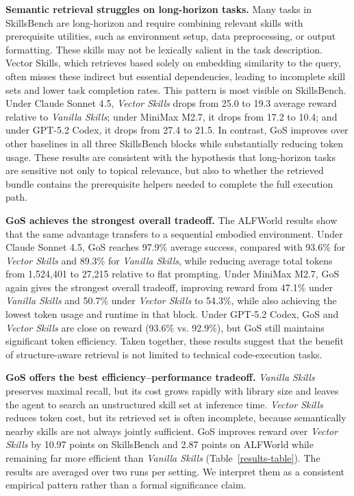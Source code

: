 \noindent\textbf{Semantic retrieval struggles on long-horizon tasks.}
% 
Many tasks in SkillsBench are long-horizon and require combining relevant skills with prerequisite utilities, such as environment setup, data preprocessing, or output formatting. These skills may not be lexically salient in the task description.
%
Vector Skills, which retrieves based solely on embedding similarity to the query, often misses these indirect but essential dependencies, leading to incomplete skill sets and lower task completion rates.
%
This pattern is most visible on SkillsBench. Under Claude Sonnet 4.5, \textit{Vector Skills} drops from 25.0 to 19.3 average reward relative to \textit{Vanilla Skills}; under MiniMax M2.7, it drops from 17.2 to 10.4; and under GPT-5.2 Codex, it drops from 27.4 to 21.5. In contrast, GoS improves over other baselines in all three SkillsBench blocks while substantially reducing token usage.
%
These results are consistent with the hypothesis that long-horizon tasks are sensitive not only to topical relevance, but also to whether the retrieved bundle contains the prerequisite helpers needed to complete the full execution path.


\noindent\textbf{GoS achieves the strongest overall tradeoff.}
%
The ALFWorld results show that the same advantage transfers to a sequential embodied environment. Under Claude Sonnet 4.5, GoS reaches 97.9\% average success, compared with 93.6\% for \textit{Vector Skills} and 89.3\% for \textit{Vanilla Skills}, while reducing average total tokens from 1,524,401 to 27,215 relative to flat prompting. Under MiniMax M2.7, GoS again gives the strongest overall tradeoff, improving reward from 47.1\% under \textit{Vanilla Skills} and 50.7\% under \textit{Vector Skills} to 54.3\%, while also achieving the lowest token usage and runtime in that block. Under GPT-5.2 Codex, GoS and \textit{Vector Skills} are close on reward (93.6\% vs. 92.9\%), but GoS still maintains significant token efficiency. Taken together, these results suggest that the benefit of structure-aware retrieval is not limited to technical code-execution tasks.


\noindent\textbf{GoS offers the best efficiency--performance tradeoff.}
%
\textit{Vanilla Skills} preserves maximal recall, but its cost grows rapidly with library size and leaves the agent to search an unstructured skill set at inference time. 
%
\textit{Vector Skills} reduces token cost, but its retrieved set is often incomplete, because semantically nearby skills are not always jointly sufficient. 
%
GoS improves reward over \textit{Vector Skills} by 10.97 points on SkillsBench and 2.87 points on ALFWorld while remaining far more efficient than \textit{Vanilla Skills} (Table~\ref{results-table}). 
%
The results are averaged over two runs per setting. We interpret them as a consistent empirical pattern rather than a formal significance claim.

